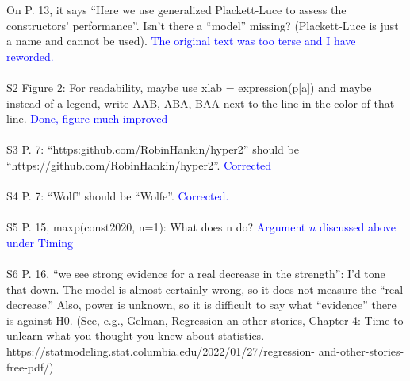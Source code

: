 \documentclass[12pt]{article}
\begin{document}
On P. 13, it says ``Here we use generalized Plackett-Luce to assess
the constructors' performance''. Isn't there a ``model'' missing?
(Plackett-Luce is just a name and cannot be used).
\textcolor{blue}{The original text was too terse and I have
  reworded.}\\ \\


S2 Figure 2: For readability, maybe use xlab = expression(p[a]) and maybe
instead of a legend, write AAB, ABA, BAA next to the line in the color
of that line.
\textcolor{blue}{Done, figure much improved}\\ \\


S3 P. 7: ``https:github.com/RobinHankin/hyper2'' should be
``https://github.com/RobinHankin/hyper2''.
\textcolor{blue}{Corrected}\\ \\


S4 P. 7: ``Wolf'' should be ``Wolfe''.
\textcolor{blue}{Corrected.}\\ \\


S5 P. 15, maxp(const2020, n=1): What does n do?
\textcolor{blue}{Argument $n$ discussed above under Timing}\\ \\

S6 P. 16, ``we see strong evidence for a real decrease in the
strength'': I'd tone that down.  The model is almost certainly wrong,
so it does not measure the ``real decrease.'' Also, power is unknown,
so it is difficult to say what ``evidence'' there is against H0. (See,
e.g., Gelman, Regression an other stories, Chapter 4: Time to unlearn
what you thought you knew about
statistics. https://statmodeling.stat.columbia.edu/2022/01/27/regression-
and-other-stories-free-pdf/)\\
\end{document}
